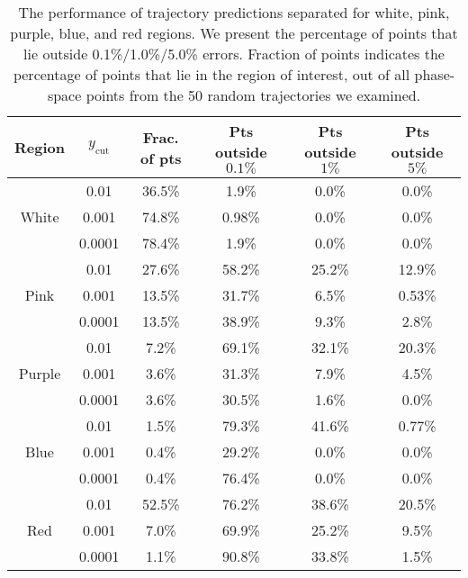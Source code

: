 \documentclass[main.tex]{subfiles}
\begin{document}
\begin{table}
    \centering
    \small
    \begin{tabular}{|c|c|c|c|c|c|}
        \hline
        Region & $y_{\mathrm{cut}}$ & Frac. of pts & Pts outside $0.1\%$ & Pts outside $1\%$ & Pts outside $5\%$ \\
        \hline
        \multirow{3}{*}{White} & 0.01   & 36.5\% & 1.9\% & 0.0\% & 0.0\% \\
        \cline{2-6}
                               & 0.001  & 74.8\% & 0.98\% & 0.0\% & 0.0\% \\
        \cline{2-6}
                               & 0.0001 & 78.4\% & 1.9\% & 0.0\%  & 0.0\% \\
        \hline
        \hline
        \multirow{3}{*}{Pink}  & 0.01   & 27.6\% & 58.2\% & 25.2\% & 12.9\% \\
        \cline{2-6}
                               & 0.001  & 13.5\% & 31.7\% & 6.5\% & 0.53\% \\
        \cline{2-6}
                               & 0.0001 & 13.5\% & 38.9\% & 9.3\% & 2.8\% \\
        \hline
        \hline
        \multirow{3}{*}{Purple}& 0.01   & 7.2\% & 69.1\% & 32.1\% & 20.3\% \\
        \cline{2-6}
                               & 0.001  & 3.6\% & 31.3\% & 7.9\% & 4.5\% \\
        \cline{2-6}
                               & 0.0001 & 3.6\% & 30.5\% & 1.6\% & 0.0\% \\
        \hline
        \hline
        \multirow{3}{*}{Blue}  & 0.01   & 1.5\% & 79.3\% & 41.6\% & 0.77\% \\
        \cline{2-6}
                               & 0.001  & 0.4\% & 29.2\% & 0.0\% & 0.0\% \\
        \cline{2-6}
                               & 0.0001 & 0.4\% & 76.4\% & 0.0\% & 0.0\% \\
        \hline
        \hline
        \multirow{3}{*}{Red}   & 0.01   & 52.5\% & 76.2\% & 38.6\% & 20.5\% \\
        \cline{2-6}
                               & 0.001  & 7.0\%  & 69.9\% & 25.2\% & 9.5\% \\
        \cline{2-6}
                               & 0.0001 & 1.1\%  & 90.8\% & 33.8\% & 1.5\% \\
        \hline
    \end{tabular}
    \caption{The performance of trajectory predictions separated for white, pink, purple, blue, and red regions.
    We present the percentage of points that lie outside 0.1\%/1.0\%/5.0\% errors.
    Fraction of points indicates the percentage of points that lie in the region of interest, out of all phase-space points from the 50 random trajectories we examined.
    }
    \label{table:trajectory_predictions}
\end{table}
\end{document}
